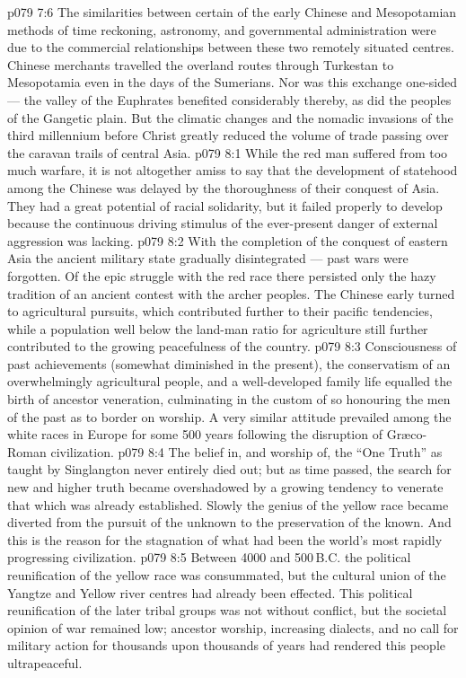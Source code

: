 \vs p079 7:6 The similarities between certain of the early Chinese and Mesopotamian methods of time reckoning, astronomy, and governmental administration were due to the commercial relationships between these two remotely situated centres. Chinese merchants travelled the overland routes through Turkestan to Mesopotamia even in the days of the Sumerians. Nor was this exchange one\hyp{}sided --- the valley of the Euphrates benefited considerably thereby, as did the peoples of the Gangetic plain. But the climatic changes and the nomadic invasions of the third millennium before Christ greatly reduced the volume of trade passing over the caravan trails of central Asia.
\vs p079 8:1 While the red man suffered from too much warfare, it is not altogether amiss to say that the development of statehood among the Chinese was delayed by the thoroughness of their conquest of Asia. They had a great potential of racial solidarity, but it failed properly to develop because the continuous driving stimulus of the ever\hyp{}present danger of external aggression was lacking.
\vs p079 8:2 With the completion of the conquest of eastern Asia the ancient military state gradually disintegrated --- past wars were forgotten. Of the epic struggle with the red race there persisted only the hazy tradition of an ancient contest with the archer peoples. The Chinese early turned to agricultural pursuits, which contributed further to their pacific tendencies, while a population well below the land\hyp{}man ratio for agriculture still further contributed to the growing peacefulness of the country.
\vs p079 8:3 Consciousness of past achievements (somewhat diminished in the present), the conservatism of an overwhelmingly agricultural people, and a well\hyp{}developed family life equalled the birth of ancestor veneration, culminating in the custom of so honouring the men of the past as to border on worship. A very similar attitude prevailed among the white races in Europe for some 500 years following the disruption of Gr\ae co\hyp{}Roman civilization.
\vs p079 8:4 The belief in, and worship of, the “One Truth” as taught by Singlangton never entirely died out; but as time passed, the search for new and higher truth became overshadowed by a growing tendency to venerate that which was already established. Slowly the genius of the yellow race became diverted from the pursuit of the unknown to the preservation of the known. And this is the reason for the stagnation of what had been the world’s most rapidly progressing civilization.
\vs p079 8:5 \pc Between 4000 and 500\,B.C. the political reunification of the yellow race was consummated, but the cultural union of the Yangtze and Yellow river centres had already been effected. This political reunification of the later tribal groups was not without conflict, but the societal opinion of war remained low; ancestor worship, increasing dialects, and no call for military action for thousands upon thousands of years had rendered this people ultrapeaceful.
